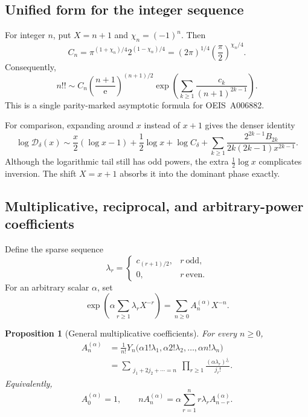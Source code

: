 \documentclass[11pt,oneside]{article}
\theoremstyle{plain}
\newtheorem{proposition}[theorem]{Proposition}
\theoremstyle{definition}
\theoremstyle{remark}
\newcommand{\e}{\mathrm e}
\newcommand{\BellC}{Y}
\newcommand{\DF}{\mathcal D}
\begin{document}
\subsection{Unified form for the integer sequence}

For integer \(n\), put \(X=n+1\) and \(\chi_n=(-1)^n\).  Then
\begin{equation}
 C_n=\pi^{(1+\chi_n)/4}2^{(1-\chi_n)/4}
 =(2\pi)^{1/4}\left(\frac\pi2\right)^{\chi_n/4}.
 \label{eq:Cn}
\end{equation}
Consequently,
\begin{equation}
 n!!\sim C_n\left(\frac{n+1}{\e}\right)^{(n+1)/2}
 \exp\!\left(\sum_{k\ge1}\frac{c_k}{(n+1)^{2k-1}}\right).
 \label{eq:integer-forward-unified}
\end{equation}
This is a single parity-marked asymptotic formula for OEIS~A006882.

For comparison, expanding around \(x\) instead of \(x+1\) gives the denser
identity
\begin{equation}
 \log\DF_\delta(x)
 \sim \frac x2(\log x-1)+\frac12\log x+\log C_\delta
 +\sum_{k\ge1}
 \frac{2^{2k-1}B_{2k}}{2k(2k-1)x^{2k-1}}.
 \label{eq:uncentered-forward}
\end{equation}
Although the logarithmic tail still has odd powers, the extra
\(\tfrac12\log x\) complicates inversion.  The shift \(X=x+1\) absorbs it into
the dominant phase exactly.

\subsection{Multiplicative, reciprocal, and arbitrary-power coefficients}
\label{sec:multiplicative-coefficients}

Define the sparse sequence
\begin{equation}
 \lambda_r=
 \begin{cases}
 c_{(r+1)/2},&r\ \text{odd},\\
 0,&r\ \text{even}.
 \end{cases}
 \label{eq:lambda-r}
\end{equation}
For an arbitrary scalar \(\alpha\), set
\begin{equation}
 \exp\!\left(\alpha\sum_{r\ge1}\lambda_rX^{-r}\right)
 =\sum_{n\ge0}A_n^{(\alpha)}X^{-n}.
 \label{eq:Aalpha-def}
\end{equation}

\begin{proposition}[General multiplicative coefficients]
\label{prop:Aalpha}
For every \(n\ge0\),
\begin{align}
 A_n^{(\alpha)}
 &=\frac1{n!}\BellC_n\bigl(\alpha1!\lambda_1,
                \alpha2!\lambda_2,\ldots,\alpha n!\lambda_n\bigr)
 \label{eq:Aalpha-bell}\\
 &=\sum_{\substack{j_1+2j_2+\cdots=n}}
   \prod_{r\ge1}\frac{(\alpha\lambda_r)^{j_r}}{j_r!}.
 \label{eq:Aalpha-partition}
\end{align}
Equivalently,
\begin{equation}
 A_0^{(\alpha)}=1,
 \qquad
 nA_n^{(\alpha)}
 =\alpha\sum_{r=1}^n r\lambda_rA_{n-r}^{(\alpha)}.
 \label{eq:Aalpha-recurrence}
\end{equation}
\end{proposition}
\end{document}

